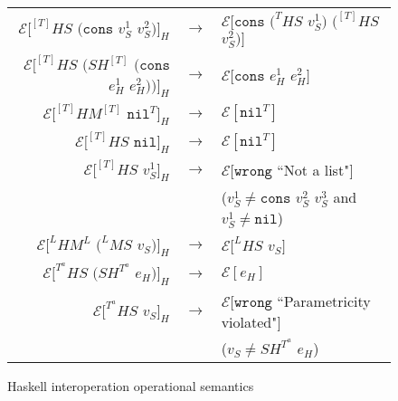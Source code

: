 \begin{figure}[p]
\begin{tabular}{rcl}
$\mathscr{E}[^{[T]}HS$ $(\mathtt{cons}$ $v_{S}^{1}$ $v_{S}^{2})]_{H}$ & $\rightarrow$ & $\mathscr{E}[\mathtt{cons}$ $(^{T}HS$ $v_{S}^{1})$ $(^{[T]}HS$ $v_{S}^{2})]$ \\
$\mathscr{E}[^{[T]}HS$ $(SH^{[T]}$ $(\mathtt{cons}$ $e_{H}^{1}$ $e_{H}^{2}))]_{H}$ & $\rightarrow$ & $\mathscr{E}[\mathtt{cons}$ $e_{H}^{1}$ $e_{H}^{2}]$ \\
$\mathscr{E}[^{[T]}HM^{[T]}$ $\mathtt{nil}^{T}]_{H}$ & $\rightarrow$ & $\mathscr{E}[\mathtt{nil}^{T}]$ \\
$\mathscr{E}[^{[T]}HS$ $\mathtt{nil}]_{H}$ & $\rightarrow$ & $\mathscr{E}[\mathtt{nil}^{T}]$ \\
$\mathscr{E}[^{[T]}HS$ $v_{S}^{1}]_{H}$ & $\rightarrow$ & $\mathscr{E}[\mathtt{wrong}$ ``Not a list"$]$ \\
&& ($v_{S}^{1}\neq\mathtt{cons}$ $v_{S}^{2}$ $v_{S}^{3}$ and $v_{S}^{1}\neq\mathtt{nil}$) \\
$\mathscr{E}[^{L}HM^{L}$ $(^{L}MS$ $v_{S})]_{H}$ & $\rightarrow$ & $\mathscr{E}[^{L}HS$ $v_{S}]$ \\
$\mathscr{E}[^{T^{a}}HS$ $(SH^{T^{a}}$ $e_{H})]_{H}$ & $\rightarrow$ & $\mathscr{E}[e_{H}]$ \\
$\mathscr{E}[^{T^{a}}HS$ $v_{S}]_{H}$ & $\rightarrow$ & $\mathscr{E}[\mathtt{wrong}$ ``Parametricity violated"$]$ \\
&& ($v_{S}\neq SH^{T^{a}}$ $e_{H}$)
\end{tabular}
\caption{Haskell interoperation operational semantics}
\label{hios}
\end{figure}